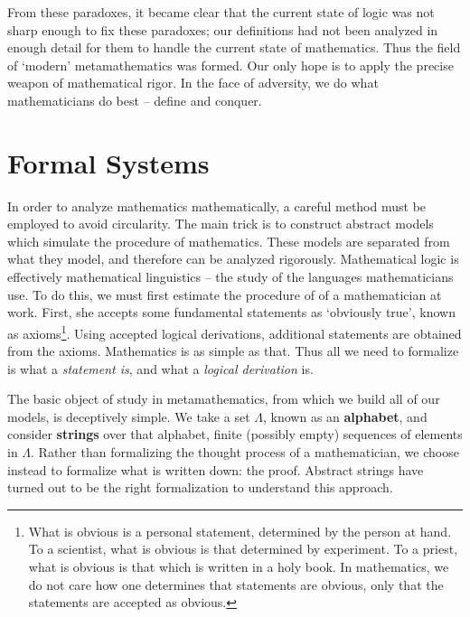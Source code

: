 From these paradoxes, it became clear that the current state of logic was not sharp enough to fix these paradoxes; our definitions had not been analyzed in enough detail for them to handle the current state of mathematics. Thus the field of `modern' metamathematics was formed. Our only hope is to apply the precise weapon of mathematical rigor. In the face of adversity, we do what mathematicians do best -- define and conquer.

\section{Formal Systems}

In order to analyze mathematics mathematically, a careful method must be employed to avoid circularity. The main trick is to construct abstract models which simulate the procedure of mathematics. These models are separated from what they model, and therefore can be analyzed rigorously. Mathematical logic is effectively mathematical linguistics -- the study of the languages mathematicians use. To do this, we must first estimate the procedure of of a mathematician at work. First, she accepts some fundamental statements as `obviously true', known as axioms\footnote{What is obvious is a personal statement, determined by the person at hand. To a scientist, what is obvious is that determined by experiment. To a priest, what is obvious is that which is written in a holy book. In mathematics, we do not care how one determines that statements are obvious, only that the statements are accepted as obvious.}. Using accepted logical derivations, additional statements are obtained from the axioms. Mathematics is as simple as that. Thus all we need to formalize is what a {\it statement is}, and what a {\it logical derivation} is.

The basic object of study in metamathematics, from which we build all of our models, is deceptively simple. We take a set $\Lambda$, known as an {\bf alphabet}, and consider {\bf strings} over that alphabet, finite (possibly empty) sequences of elements in $\Lambda$. Rather than formalizing the thought process of a mathematician, we choose instead to formalize what is written down: the proof. Abstract strings have turned out to be the right formalization to understand this approach.

